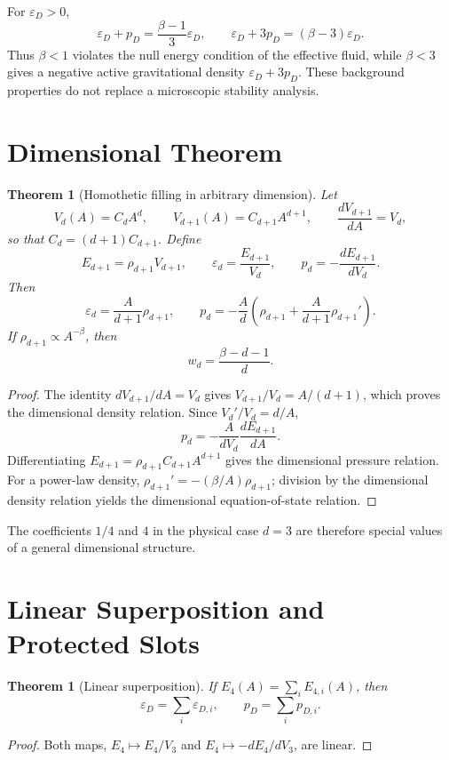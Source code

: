 \documentclass[11pt,a4paper]{article}
\def\dd{d}%
\numberwithin{equation}{section}
\newtheorem{theorem}[criterion]{Theorem}
\theoremstyle{remark}
\newcommand{\Efour}{E_4}
\newcommand{\epsD}{\varepsilon_D}
\newcommand{\pD}{p_D}
\newcommand{\dd}{\mathrm{d}}
\begin{document}
For \(\epsD>0\),
\begin{equation}
\epsD+
\pD=\frac{\beta-1}{3}\epsD,
\qquad
\epsD+3\pD=(\beta-3)\epsD.
\end{equation}
Thus \(\beta<1\) violates the null energy condition of the effective fluid, while \(\beta<3\) gives a negative active gravitational density \(\epsD+3\pD\). These background properties do not replace a microscopic stability analysis.

\section{Dimensional Theorem}
\begin{theorem}[Homothetic filling in arbitrary dimension]
Let
\begin{equation}
V_d(A)=C_dA^d,
\qquad
V_{d+1}(A)=C_{d+1}A^{d+1},
\qquad
\frac{\dd V_{d+1}}{\dd A}=V_d,
\end{equation}
so that \(C_d=(d+1)C_{d+1}\). Define
\begin{equation}
E_{d+1}=\rho_{d+1}V_{d+1},
\qquad
\varepsilon_d=\frac{E_{d+1}}{V_d},
\qquad
p_d=-\frac{\dd E_{d+1}}{\dd V_d}.
\end{equation}
Then
\begin{equation}
\varepsilon_d=\frac{A}{d+1}\rho_{d+1},
\qquad
p_d=-\frac{A}{d}\left(\rho_{d+1}+\frac{A}{d+1}\rho_{d+1}'\right).
\end{equation}
If \(\rho_{d+1}\propto A^{-\beta}\), then
\begin{equation}
w_d=\frac{\beta-d-1}{d}.
\end{equation}
\end{theorem}
\begin{proof}
The identity \(\dd V_{d+1}/\dd A=V_d\) gives \(V_{d+1}/V_d=A/(d+1)\), which proves the dimensional density relation. Since \(V_d'/V_d=d/A\),
\begin{equation}
p_d=-\frac{A}{dV_d}\frac{\dd E_{d+1}}{\dd A}.
\end{equation}
Differentiating \(E_{d+1}=\rho_{d+1}C_{d+1}A^{d+1}\) gives the dimensional pressure relation. For a power-law density, \(\rho_{d+1}'=-(\beta/A)\rho_{d+1}\); division by the dimensional density relation yields the dimensional equation-of-state relation.
\end{proof}

The coefficients \(1/4\) and \(4\) in the physical case \(d=3\) are therefore special values of a general dimensional structure.

\section{Linear Superposition and Protected Slots}
\begin{theorem}[Linear superposition]
If \(\Efour(A)=\sum_i E_{4,i}(A)\), then
\begin{equation}
\epsD=\sum_i \varepsilon_{D,i},
\qquad
\pD=\sum_i p_{D,i}.
\end{equation}
\end{theorem}
\begin{proof}
Both maps, \(\Efour\mapsto \Efour/V_3\) and \(\Efour\mapsto -\dd\Efour/\dd V_3\), are linear.
\end{proof}
\end{document}

